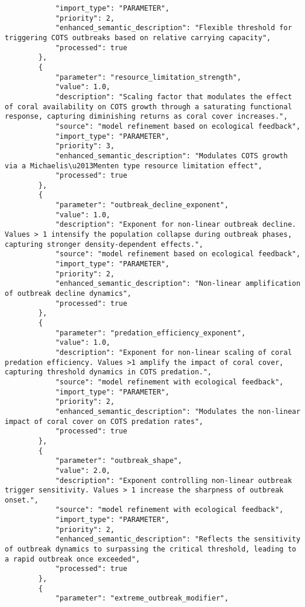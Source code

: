 \begin{lstlisting}
            "import_type": "PARAMETER",
            "priority": 2,
            "enhanced_semantic_description": "Flexible threshold for triggering COTS outbreaks based on relative carrying capacity",
            "processed": true
        },
        {
            "parameter": "resource_limitation_strength",
            "value": 1.0,
            "description": "Scaling factor that modulates the effect of coral availability on COTS growth through a saturating functional response, capturing diminishing returns as coral cover increases.",
            "source": "model refinement based on ecological feedback",
            "import_type": "PARAMETER",
            "priority": 3,
            "enhanced_semantic_description": "Modulates COTS growth via a Michaelis\u2013Menten type resource limitation effect",
            "processed": true
        },
        {
            "parameter": "outbreak_decline_exponent",
            "value": 1.0,
            "description": "Exponent for non-linear outbreak decline. Values > 1 intensify the population collapse during outbreak phases, capturing stronger density-dependent effects.",
            "source": "model refinement based on ecological feedback",
            "import_type": "PARAMETER",
            "priority": 2,
            "enhanced_semantic_description": "Non-linear amplification of outbreak decline dynamics",
            "processed": true
        },
        {
            "parameter": "predation_efficiency_exponent",
            "value": 1.0,
            "description": "Exponent for non-linear scaling of coral predation efficiency. Values >1 amplify the impact of coral cover, capturing threshold dynamics in COTS predation.",
            "source": "model refinement with ecological feedback",
            "import_type": "PARAMETER",
            "priority": 2,
            "enhanced_semantic_description": "Modulates the non-linear impact of coral cover on COTS predation rates",
            "processed": true
        },
        {
            "parameter": "outbreak_shape",
            "value": 2.0,
            "description": "Exponent controlling non-linear outbreak trigger sensitivity. Values > 1 increase the sharpness of outbreak onset.",
            "source": "model refinement with ecological feedback",
            "import_type": "PARAMETER",
            "priority": 2,
            "enhanced_semantic_description": "Reflects the sensitivity of outbreak dynamics to surpassing the critical threshold, leading to a rapid outbreak once exceeded",
            "processed": true
        },
        {
            "parameter": "extreme_outbreak_modifier",

\end{lstlisting}
